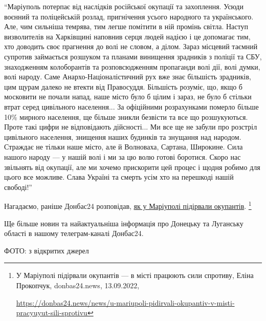 \enquote{Маріуполь потерпає від наслідків російської окупації та захоплення. Усюди
воєнний та поліцейській розлад, пригнічення усього народного та українського.
Але, чим сильніша темрява, тим легше помітити в ній промінь світла. Наступ
визволителів на Харківщині наповнив серця людей надією і це допомагає тим, хто
доводить своє прагнення до волі не словом, а ділом. Зараз місцевий таємний
супротив займається розшуком та планами винищення зрадників з поліції та СБУ,
знаходженням колоборантів та розповсюдженням пропаганди волі дії, волі думки,
волі народу. Саме Анархо-Націоналістичний рух вже знає більшість зрадників, цим
щурам далеко не втекти від Правосуддя. Більшість розуміє, що, якщо б московити
не почали напад, наше місто було б цілим і зараз, не було б стільки втрат серед
цивільного населення... За офіційними розрахунками померло більше 10\% мирного
населення, ще більше зникли безвісти та все що розшукуються. Проте такі цифри
не відповідають дійсності... Ми все ще не забули про розстріл цивільного
населення, знищення наших будинків та знущання над народом. Страждає не тільки
наше місто, але й Волноваха, Сартана, Широкине. Сила нашого народу — у нашій
волі і ми за цю волю готові боротися. Скоро нас звільнять від окупації, але ми
хочемо прискорити цей процес і щодня робимо для цього все можливе. Слава
Україні та смерть усім хто на перешкоді нашій свободі!}

Нагадаємо, раніше Донбас24 розповідав, \href{https://donbas24.news/news/u-mariupoli-pidirvali-okupantiv-v-misti-pracyuyut-sili-sprotivu}{як у Маріуполі підірвали окупантів}.%
\footnote{У Маріуполі підірвали окупантів — в місті працюють сили спротиву, Еліна Прокопчук, donbas24.news, 13.09.2022, \par\url{https://donbas24.news/news/u-mariupoli-pidirvali-okupantiv-v-misti-pracyuyut-sili-sprotivu}}

Ще більше новин та найактуальніша інформація про Донецьку та Луганську області
в нашому телеграм-каналі Донбас24.

ФОТО: з відкритих джерел
